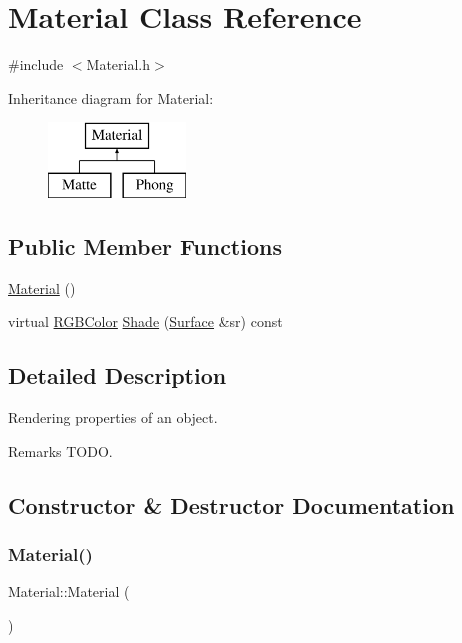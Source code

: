\hypertarget{class_material}{}\section{Material Class Reference}
\label{class_material}


{\ttfamily \#include $<$Material.\+h$>$}

Inheritance diagram for Material\+:\begin{figure}[H]
\begin{center}
\leavevmode
\includegraphics[height=2.000000cm]{class_material}
\end{center}
\end{figure}
\subsection*{Public Member Functions}
\begin{DoxyCompactItemize}
\item 
\hyperlink{class_material_a137e987401b63eb7c6c27c3e38bc74b5}{Material} ()
\item 
virtual \hyperlink{class_r_g_b_color}{R\+G\+B\+Color} \hyperlink{class_material_aeccd880ee7b86a849e8f2d2f0bcf4fc7}{Shade} (\hyperlink{class_surface}{Surface} \&sr) const
\end{DoxyCompactItemize}


\subsection{Detailed Description}
Rendering properties of an object. \begin{DoxyRemark}{Remarks}
T\+O\+DO. 
\end{DoxyRemark}


\subsection{Constructor \& Destructor Documentation}
\hypertarget{class_material_a137e987401b63eb7c6c27c3e38bc74b5}{}\label{class_material_a137e987401b63eb7c6c27c3e38bc74b5} 
\subsubsection{\texorpdfstring{Material()}{Material()}}
{\footnotesize\ttfamily Material\+::\+Material (\begin{DoxyParamCaption}{ }\end{DoxyParamCaption})}

